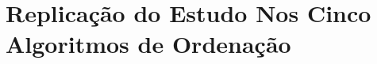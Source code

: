 \documentclass[a4paper,12pt]{article}
\begin{document}
\chapter{Replicação do Estudo Nos Cinco Algoritmos de Ordenação }
\end{document}
